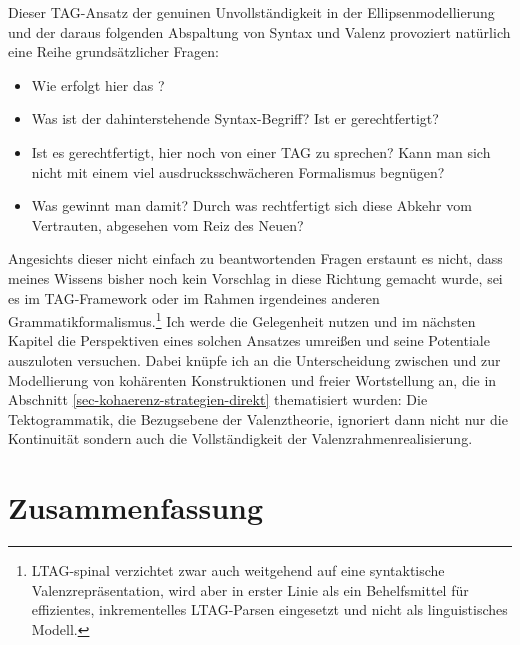 Dieser TAG-Ansatz der genuinen Unvollständigkeit in der Ellipsenmodellierung und der daraus folgenden Abspaltung von Syntax und Valenz provoziert natürlich eine Reihe grundsätzlicher Fragen: 
\begin{itemize}
  \item Wie erfolgt hier das ?
  \item Was ist der dahinterstehende Syntax-Begriff? Ist er gerechtfertigt?
  \item Ist es gerechtfertigt, hier noch von einer TAG zu sprechen? Kann man sich nicht mit einem viel ausdrucksschwächeren Formalismus begnügen? 
  \item Was gewinnt man damit? Durch was rechtfertigt sich diese Abkehr vom Vertrauten, abgesehen vom Reiz des Neuen?
\end{itemize}
Angesichts dieser nicht einfach zu beantwortenden Fragen erstaunt es nicht, dass meines Wissens bisher noch kein Vorschlag in diese Richtung gemacht wurde, sei es im TAG-Framework oder im Rahmen irgendeines anderen Grammatikformalismus.\footnote{LTAG-spinal \citep{Shen:06,Shen:etal:08} verzichtet zwar auch weitgehend auf eine syntaktische Valenzrepräsentation, wird aber in erster Linie als ein Behelfsmittel für effizientes, inkrementelles LTAG-Parsen eingesetzt und nicht als linguistisches Modell.} Ich werde die Gelegenheit nutzen und im nächsten Kapitel die Perspektiven eines solchen Ansatzes umrei\ss en und seine Potentiale auszuloten versuchen. Dabei knüpfe ich an die Unterscheidung zwischen  und  zur Modellierung von kohärenten Konstruktionen und freier Wortstellung an, die in Abschnitt \ref{sec-kohaerenz-strategien-direkt} thematisiert wurden: Die Tektogrammatik, die Bezugsebene der Valenztheorie, ignoriert dann nicht nur die Kontinuität sondern auch die Vollständigkeit der Valenzrahmenrealisierung.  



\section{Zusammenfassung}

